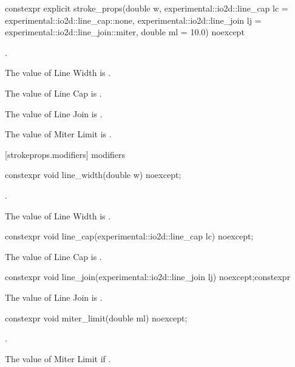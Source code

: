 \begin{itemdecl}
constexpr explicit stroke_props(double w,
  experimental::io2d::line_cap lc = experimental::io2d::line_cap::none,
  experimental::io2d::line_join lj = experimental::io2d::line_join::miter,
  double ml = 10.0) noexcept    
\end{itemdecl}
\begin{itemdescr}
\pnum
\requires
{}.

\pnum
{}

\pnum
\effects
The value of Line Width is .

\pnum
The value of Line Cap is .

\pnum
The value of Line Join is .

\pnum
The value of Miter Limit is .
\end{itemdescr}

 [strokeprops.modifiers] { modifiers}

\begin{itemdecl}
constexpr void line_width(double w) noexcept;
\end{itemdecl}
\begin{itemdescr}
\pnum
\requires
{}.

\pnum
\effects
The value of Line Width is .
\end{itemdescr}

\begin{itemdecl}
constexpr void line_cap(experimental::io2d::line_cap lc) noexcept;
\end{itemdecl}
\begin{itemdescr}
\pnum
\effects
The value of Line Cap is .
\end{itemdescr}

\begin{itemdecl}
constexpr void line_join(experimental::io2d::line_join lj) noexcept;constexpr \end{itemdecl}
\begin{itemdescr}
\pnum
\effects
The value of Line Join is .
\end{itemdescr}

\begin{itemdecl}
constexpr void miter_limit(double ml) noexcept;
\end{itemdecl}
\begin{itemdescr}
\pnum
\requires
{}.

\pnum
The value of Miter Limit if .
\end{itemdescr}

